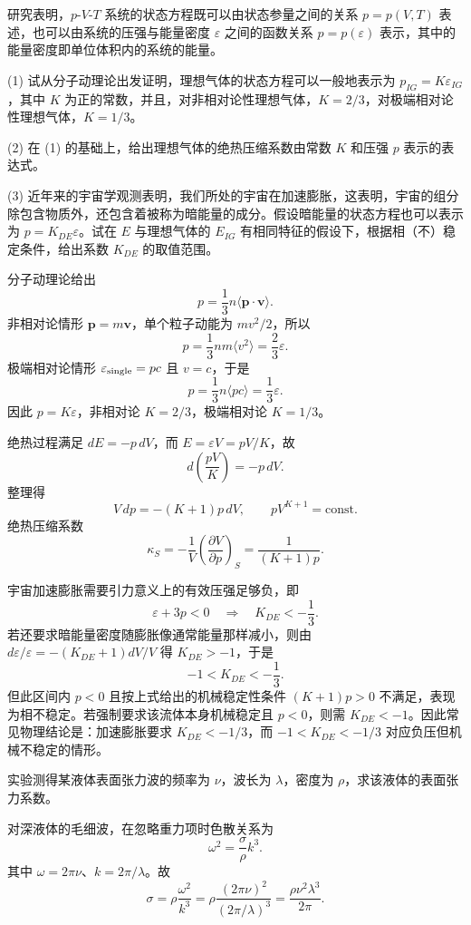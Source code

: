 \begin{question}
研究表明，$p$-$V$-$T$ 系统的状态方程既可以由状态参量之间的关系 $p=p(V,T)$ 表述，也可以由系统的压强与能量密度 $\varepsilon$ 之间的函数关系 $p=p(\varepsilon)$ 表示，其中的能量密度即单位体积内的系统的能量。

(1) 试从分子动理论出发证明，理想气体的状态方程可以一般地表示为 $p_{IG}=K\varepsilon_{IG}$，其中 $K$ 为正的常数，并且，对非相对论性理想气体，$K=2/3$，对极端相对论性理想气体，$K=1/3$。

(2) 在 (1) 的基础上，给出理想气体的绝热压缩系数由常数 $K$ 和压强 $p$ 表示的表达式。

(3) 近年来的宇宙学观测表明，我们所处的宇宙在加速膨胀，这表明，宇宙的组分除包含物质外，还包含着被称为暗能量的成分。假设暗能量的状态方程也可以表示为 $p=K_{DE}\varepsilon$。试在 $E$ 与理想气体的 $E_{IG}$ 有相同特征的假设下，根据相（不）稳定条件，给出系数 $K_{DE}$ 的取值范围。
\begin{solution}
分子动理论给出
\[
p=\frac13 n\langle \mathbf p\cdot\mathbf v\rangle.
\]
非相对论情形 $\mathbf p=m\mathbf v$，单个粒子动能为 $mv^2/2$，所以
\[
p=\frac13 nm\langle v^2\rangle=\frac23\varepsilon.
\]
极端相对论情形 $\varepsilon_{\rm single}=pc$ 且 $v=c$，于是
\[
p=\frac13 n\langle pc\rangle=\frac13\varepsilon.
\]
因此 $p=K\varepsilon$，非相对论 $K=2/3$，极端相对论 $K=1/3$。

绝热过程满足 $dE=-p\,dV$，而 $E=\varepsilon V=pV/K$，故
\[
d\left(\frac{pV}{K}\right)=-p\,dV.
\]
整理得
\[
V\,dp=-(K+1)p\,dV,
\qquad pV^{K+1}=\text{const}.
\]
绝热压缩系数
\[
\kappa_S=-\frac1V\left(\frac{\partial V}{\partial p}\right)_S
=\frac1{(K+1)p}.
\]

宇宙加速膨胀需要引力意义上的有效压强足够负，即
\[
\varepsilon+3p<0\quad\Rightarrow\quad K_{DE}<-\frac13.
\]
若还要求暗能量密度随膨胀像通常能量那样减小，则由 $d\varepsilon/\varepsilon=-(K_{DE}+1)dV/V$ 得 $K_{DE}>-1$，于是
\[
-1<K_{DE}<-\frac13.
\]
但此区间内 $p<0$ 且按上式给出的机械稳定性条件 $(K+1)p>0$ 不满足，表现为相不稳定。若强制要求该流体本身机械稳定且 $p<0$，则需 $K_{DE}<-1$。因此常见物理结论是：加速膨胀要求 $K_{DE}< -1/3$，而 $-1<K_{DE}<-1/3$ 对应负压但机械不稳定的情形。
\end{solution}
\end{question}

\begin{question}
实验测得某液体表面张力波的频率为 $\nu$，波长为 $\lambda$，密度为 $\rho$，求该液体的表面张力系数。
\begin{solution}
对深液体的毛细波，在忽略重力项时色散关系为
\[
\omega^2=\frac{\sigma}{\rho}k^3.
\]
其中 $\omega=2\pi\nu$、$k=2\pi/\lambda$。故
\[
\sigma=\rho\frac{\omega^2}{k^3}
=\rho\frac{(2\pi\nu)^2}{(2\pi/\lambda)^3}
=\frac{\rho\nu^2\lambda^3}{2\pi}.
\]
\end{solution}
\end{question}

